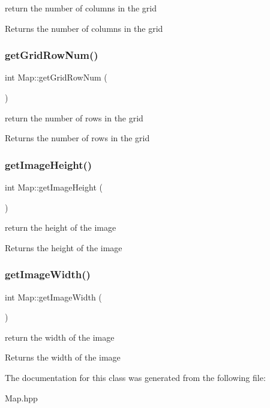 return the number of columns in the grid 

\begin{DoxyReturn}{Returns}
the number of columns in the grid 
\end{DoxyReturn}
\mbox{\label{class_map_a1cb1dccec0a3f9f2d25f5f3dfb224942}} 
\subsubsection{\texorpdfstring{get\+Grid\+Row\+Num()}{getGridRowNum()}}
{\footnotesize\ttfamily int Map\+::get\+Grid\+Row\+Num (\begin{DoxyParamCaption}{ }\end{DoxyParamCaption})}



return the number of rows in the grid 

\begin{DoxyReturn}{Returns}
the number of rows in the grid 
\end{DoxyReturn}
\mbox{\label{class_map_a77781f371aaf9f386f993714dbef40ec}} 
\subsubsection{\texorpdfstring{get\+Image\+Height()}{getImageHeight()}}
{\footnotesize\ttfamily int Map\+::get\+Image\+Height (\begin{DoxyParamCaption}{ }\end{DoxyParamCaption})}



return the height of the image 

\begin{DoxyReturn}{Returns}
the height of the image 
\end{DoxyReturn}
\mbox{\label{class_map_a2ed476fb2f9142980ce447df2b066638}} 
\subsubsection{\texorpdfstring{get\+Image\+Width()}{getImageWidth()}}
{\footnotesize\ttfamily int Map\+::get\+Image\+Width (\begin{DoxyParamCaption}{ }\end{DoxyParamCaption})}



return the width of the image 

\begin{DoxyReturn}{Returns}
the width of the image 
\end{DoxyReturn}


The documentation for this class was generated from the following file\+:\begin{DoxyCompactItemize}
\item 
Map.\+hpp\end{DoxyCompactItemize}
